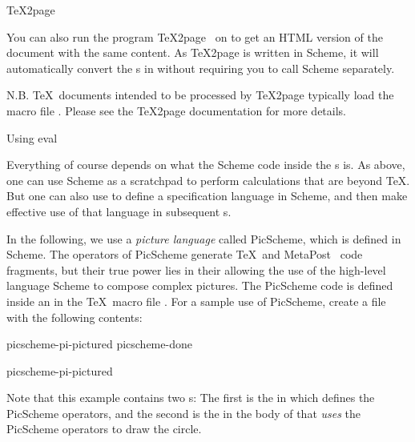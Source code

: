 \beginsection \TeX2page

You can also run the program \TeX2page~\cite{tex2page} on  to get an HTML
version of the document with the same content.  As \TeX2page is written in
Scheme, it will automatically convert the \p{\eval}s in 
without requiring you to call Scheme separately.


\n N.B.  \TeX\ documents intended to be processed by \TeX2page typically load the
macro file .  Please see the \TeX2page documentation for
more details.

 Using eval


Everything of course depends on what the Scheme code
inside the \p{\eval}s is.  As above, one can use Scheme
as a scratchpad to perform calculations that are beyond
\TeX.  But one can also use \p{\eval} to define a
specification language in Scheme, and then make
effective use of that language in subsequent
\p{\eval}s.

In the following, we use a {\em picture language}
called PicScheme, which is defined in Scheme.  The
operators of PicScheme generate \TeX\ and
MetaPost~\cite{metapost,mfbook} code fragments, but
their true power lies in their allowing the use of the
high-level language Scheme to compose complex pictures.
The PicScheme code is defined inside an \p{\eval} in
the \TeX\ macro file .  For a sample use
of PicScheme, create a file  with
the following contents:

\verbwritefile picscheme-pi-pictured
\verbwritefile picscheme-done

\p{
}
\scminput picscheme-pi-pictured
\p{
\bye
}

\n Note that this example contains two \p{\eval}s:
The first is the \p{\eval} in 
which defines the PicScheme operators, and the second
is the \p{\eval} in the body of 
that {\em uses} the PicScheme operators to draw the circle.

